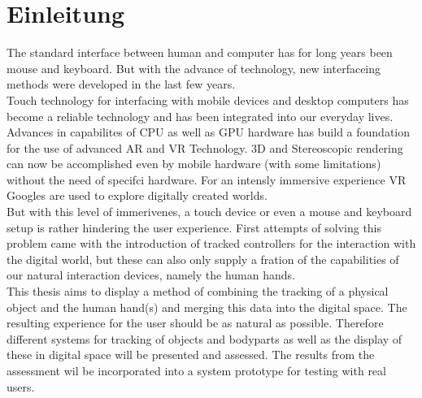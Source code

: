 \chapter{Einleitung}
The standard interface between human and computer has for long years been mouse and keyboard. But with the advance of technology, new interfaceing methods were developed in the last few years.\\
Touch technology for interfacing with mobile devices and desktop computers has become a reliable technology and has been integrated into our everyday lives.
Advances in  capabilites of CPU as well as GPU hardware has build a foundation for the use of advanced AR and VR Technology. 3D and Stereoscopic rendering can now be accomplished even by mobile hardware (with some limitations) without the need of specifci hardware. For an intensly immersive experience VR Googles are used to explore digitally created worlds.\\
But with this level of immerivenes, a touch device or even a mouse and keyboard setup is rather hindering the user experience. First attempts of solving this problem came with the introduction of tracked controllers for the interaction with the digital world, but these can also only supply a fration of the capabilities of our natural interaction devices, namely the human hands.\\This thesis aims to display a method of combining the tracking of a physical object and the human hand(s) and merging this data into the digital space. The resulting experience for the user should be as natural as possible. Therefore  different systems for tracking of objects and bodyparts as well as the display of these in digital space will be presented and assessed. The results from the assessment wil be incorporated into a system prototype for testing with real users.